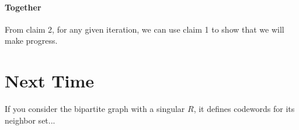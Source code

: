 \documentclass{idc_msc}
\begin{document}
\paragraph{Together}

From claim 2, for any given iteration, we can use claim 1 to show that we will make progress.

\section{Next Time}

If you consider the bipartite graph with a singular \(R\), it defines codewords for its neighbor set...
\end{document}
